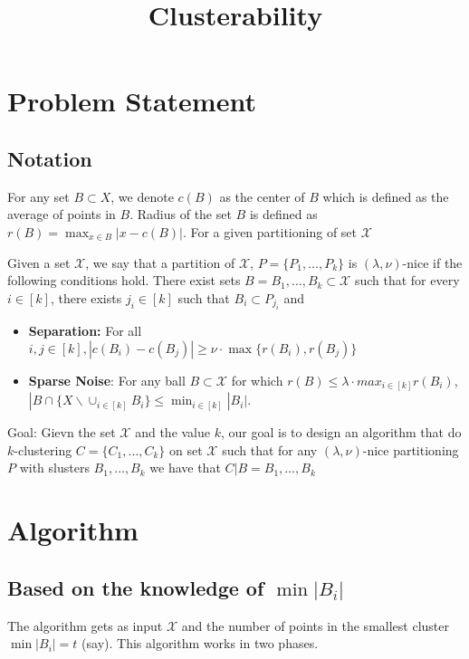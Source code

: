 \documentclass[11pt]{article}
\title{\LARGE Clusterability}
\author{}
\begin{document}
\maketitle

\section{Problem Statement}

\subsection{Notation}
For any set $B\subset X$, we denote $c(B)$ as the center of $B$ which is defined as the average of points in $B$. Radius of the set $B$ is defined as $r(B)=\max_{x\in B} |x-c(B)|$. For a given partitioning of set $\mathcal{X}$

\begin{definition}
Given a set $\mathcal{X}$, we say that a partition of $\mathcal{X}$, $P=\{P_1,\ldots,P_k\}$ is $(\lambda,\nu)$-nice if the following conditions hold. There exist sets $B=B_1,\ldots,B_k\subset \mathcal{X}$ such that for every $i\in[k]$, there exists $j_i\in[k]$ such that $B_i\subset P_{j_i}$ and
\begin{itemize}
\item{\bf{Separation}:} For all $i,j\in[k], |c(B_i)-c(B_j)|\geq \nu\cdot\max\{r(B_i),r(B_j)\}$
\item{\bf{Sparse Noise}}: For any ball $B\subset \mathcal{X}$ for which $r(B)\leq \lambda \cdot max_{i\in[k]} r(B_i)$, $|B\cap \{X \backslash \cup_{i\in[k]} B_i\}\leq \min_{i\in[k]}|B_i|$.
\end{itemize}
\end{definition}

Goal: Gievn the set $\mathcal{X}$ and the value $k$, our goal is to design an algorithm that do $k$-clustering $C=\{C_1,\ldots,C_k\}$ on set $\mathcal{X}$ such that  for any $(\lambda,\nu)$-nice partitioning $P$ with slusters $B_1,\ldots,B_k$ we have that $C|B={B_1,\ldots,B_k}$

\section{Algorithm}


\subsection{Based on the knowledge of $\min |B_i|$}
The algorithm gets as input $\mathcal{X}$ and the number of points in the smallest cluster $\min |B_i| = t$ (say). This algorithm works in two phases.
\end{document}
